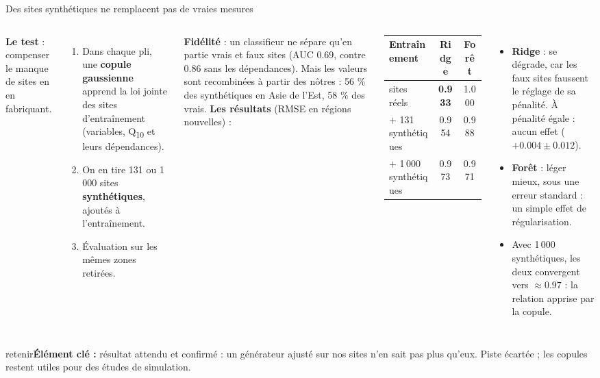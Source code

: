 \documentclass[aspectratio=169,10pt]{beamer}
\newcommand{\retenir}[1]{\vfill\begin{beamercolorbox}[sep=5pt,rounded=true]{retenir}\small\textbf{Élément clé :} #1\end{beamercolorbox}}
\newcommand{\Qdix}{Q\textsubscript{10}}
\begin{document}
\begin{frame}{Des sites synthétiques ne remplacent pas de vraies mesures}
  \begin{columns}[t]
      \small
      \textbf{Le test} : compenser le manque de sites en en fabriquant.
      \begin{enumerate}
        \item Dans chaque pli, une \textbf{copule gaussienne} apprend la loi jointe des sites d'entraînement (variables, \Qdix{} et leurs dépendances).
        \item On en tire 131 ou 1\,000 sites \textbf{synthétiques}, ajoutés à l'entraînement.
        \item Évaluation sur les mêmes zones retirées.
      \end{enumerate}
      \textbf{Fidélité} : un classifieur ne sépare qu'en partie vrais et faux sites (AUC 0.69, contre 0.86 sans les dépendances). Mais les valeurs sont recombinées à partir des nôtres : 56 \% des synthétiques en Asie de l'Est, 58 \% des vrais.
      \small
      \textbf{Les résultats} (RMSE en régions nouvelles) :

      \vspace{0.1cm}
      \begin{tabular}{lcc}
        \toprule
        Entraînement & Ridge & Forêt \\
        \midrule
        sites réels & \textbf{0.933} & 1.000 \\
        $+$ 131 synthétiques & 0.954 & 0.988 \\
        $+$ 1\,000 synthétiques & 0.973 & 0.971 \\
        \bottomrule
      \end{tabular}
      \begin{itemize}
        \item \textbf{Ridge} : se dégrade, car les faux sites faussent le réglage de sa pénalité. À pénalité égale : aucun effet ($+0.004 \pm 0.012$).
        \item \textbf{Forêt} : léger mieux, sous une erreur standard : un simple effet de régularisation.
        \item Avec 1\,000 synthétiques, les deux convergent vers $\approx 0.97$ : la relation apprise par la copule.
      \end{itemize}
  \end{columns}
  \retenir{résultat attendu et confirmé : un générateur ajusté sur nos sites n'en sait pas plus qu'eux. Piste écartée ; les copules restent utiles pour des études de simulation.}
\end{frame}
\end{document}
